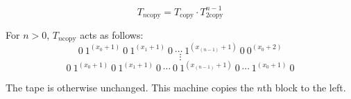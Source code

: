 $$T_{n \text{copy}} = T_{\text{copy}} \cdot T_{2 \text{copy}}^{n-1}$$

For $n > 0$, $T_{n \text{copy}}$ acts as follows:
\[
0 \ 1^{(x_0+1)} \ 0 \ 1^{(x_1+1)} \ 0 \ \cdots \ 1^{(x_{(n-1)}+1)} \ 0 \ 0^{(x_0+2)}
\]
\[
\vdots
\]
\[
0 \ 1^{(x_0+1)} \ 0 \ 1^{(x_1+1)} \ 0 \ \cdots \ 0 \ 1^{(x_{(n-1)}+1)} \ 0 \ \cdots \ 1^{(x_0+1)} \ 0
\]

The tape is otherwise unchanged. This machine copies the $n$th block to the left.
